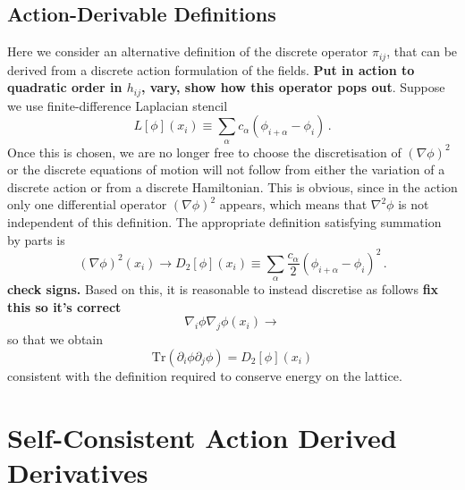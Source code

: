 \documentclass{revtex4}
\begin{document}
\subsection{Action-Derivable Definitions}
Here we consider an alternative definition of the discrete operator $\pi_{ij}$, that can be derived from a discrete action formulation of the fields.
{\bf Put in action to quadratic order in $h_{ij}$, vary, show how this operator pops out}.
Suppose we use finite-difference Laplacian stencil
\begin{equation}
  L[\phi](x_i) \equiv \sum_\alpha c_\alpha\left(\phi_{i+\alpha}-\phi_i\right) \, .
\end{equation}
Once this is chosen, we are no longer free to choose the discretisation of $(\nabla\phi)^2$ or the discrete equations of motion will not follow from either the variation of a discrete action or from a discrete Hamiltonian.
This is obvious, since in the action only one differential operator $(\nabla\phi)^2$ appears, which means that $\nabla^2\phi$ is not independent of this definition.
The appropriate definition satisfying summation by parts is
\begin{equation}
  (\nabla\phi)^2(x_i) \to D_2[\phi](x_i) \equiv \sum_\alpha \frac{c_\alpha}{2}\left(\phi_{i+\alpha}-\phi_i\right)^2 \, .
\end{equation}
{\bf check signs.}
Based on this, it is reasonable to instead discretise as follows {\bf fix this so it's correct}
\begin{equation}
  \nabla_i\phi\nabla_j\phi(x_i) \to %
\end{equation}
so that we obtain
\begin{equation}
  \mathrm{Tr}(\partial_i\phi\partial_j\phi) = D_2[\phi](x_i)
\end{equation}
consistent with the definition required to conserve energy on the lattice.

\section{Self-Consistent Action Derived Derivatives}
\end{document}
